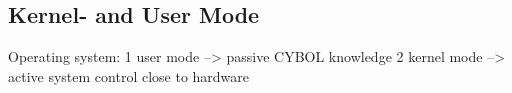 %
%
%
%
%
%
%

\subsection{Kernel- and User Mode}
\label{kernel_and_user_mode_heading}

Operating system: \cite[p. 249]{johnson}
1 user mode --> passive CYBOL knowledge
2 kernel mode --> active system control close to hardware
